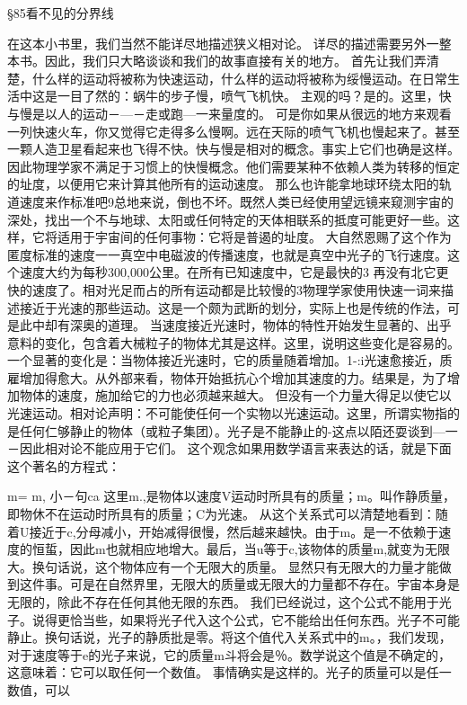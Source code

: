 §85看不见的分界线

在这本小书里，我们当然不能详尽地描述狭义相对论。
详尽的描述需要另外一整本书。因此，我们只大略谈谈和我们的故事直接有关的地方。
首先让我们弄清楚，什么样的运动将被称为快速运动，什么样的运动将被称为绥慢运动。在日常生活中这是一目了然的：蜗牛的步子慢，喷气飞机快。
主观的吗？是的。这里，快与慢是以人的运动－—－走或跑—一来量度的。
可是你如果从很远的地方来观看一列快速火车，你又觉得它走得多么慢啊。远在天际的喷气飞机也慢起来了。甚至一颗人造卫星看起来也飞得不快。快与慢是相对的概念。事实上它们也确是这样。
因此物理学家不满足于习惯上的快慢概念。他们需要某种不依赖人类为转移的恒定的址度，以便用它来计算其他所有的运动速度。
那么也许能拿地球环绕太阳的轨道速度来作标准吧9总地来说，倒也不坏。既然人类已经使用望远镜来窥测宇宙的深处，找出一个不与地球、太阳或任何特定的天体相联系的抵度可能更好一些。这样，它将适用于宇宙间的任何事物：它将是普遏的址度。
大自然恩赐了这个作为匿度标准的速度一一真空中电磁波的传播速度，也就是真空中光子的飞行速度。这个速度大约为每秒300,000公里。在所有已知速度中，它是最快的3
再没有北它更快的速度了。相对光足而占的所有运动都是比较慢的3物理学家使用快速一词来描述接近于光速的那些运动。这是一个颇为武断的划分，实际上也是传统的作法，可是此中却有深奥的道理。
当速度接近光速时，物体的特性开始发生显著的、出乎意料的变化，包含着大械粒子的物体尤其是这样。这里，说明这些变化是容易的。
一个显著的变化是：当物体接近光速时，它的质量随着增加。1-:i光速愈接近，质雇增加得愈大。从外部来看，物体开始抵抗心个增加其速度的力。结果是，为了增加物体的速度，施加给它的力也必须越来越大。
但没有一个力量大得足以使它以光速运动。相对论声明：不可能使任何一个实物以光速运动。这里，所谓实物指的是任何仁够静止的物体（或粒子集团）。光子是不能静止的-这点以陌还耍谈到—一－因此相对论不能应用于它们。
这个观念如果用数学语言来表达的话，就是下面这个著名的方程式：

m=
m,
小－句ca
这里m.,是物体以速度V运动时所具有的质量；m。叫作静质量，即物休不在运动时所具有的质量；C为光速。
从这个关系式可以清楚地看到：随着U接近于c,分母减小，开始减得很慢，然后越来越快。由于m。是一不依赖于速度的恒蜇，因此m也就相应地增大。最后，当u等于c,该物体的质量m,就变为无限大。换句话说，这个物体应有一个无限大的质量。
显然只有无限大的力量才能做到这件事。可是在自然界里，无限大的质量或无限大的力量都不存在。宇宙本身是无限的，除此不存在任何其他无限的东西。
我们已经说过，这个公式不能用于光子。说得更恰当些，如果将光子代入这个公式，它不能给出任何东西。光子不可能静止。换句话说，光子的静质批是零。将这个值代入关系式中的m。，我们发现，对于速度等于e的光子来说，它的质量m斗将会是％。数学说这个值是不确定的，这意味着：它可以取任何一个数值。
事情确实是这样的。光子的质量可以是任一数值，可以

